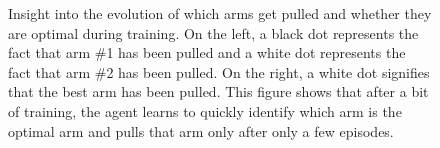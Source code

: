 \begin{figure}
	\centering
	\caption{Insight into the evolution of which arms get pulled and 
	whether they are optimal during training. On the left, a black dot
	represents the fact that arm \#1 has been pulled and a white dot
	represents the fact that arm \#2 has been pulled. On the right, a white
	dot signifies that the best arm has been pulled. This figure shows
	that after a bit of training, the agent learns to quickly identify
	which arm is the optimal arm and pulls that arm only after only 
	a few episodes.}
	\label{fig:bandit_optimality}
\end{figure}

